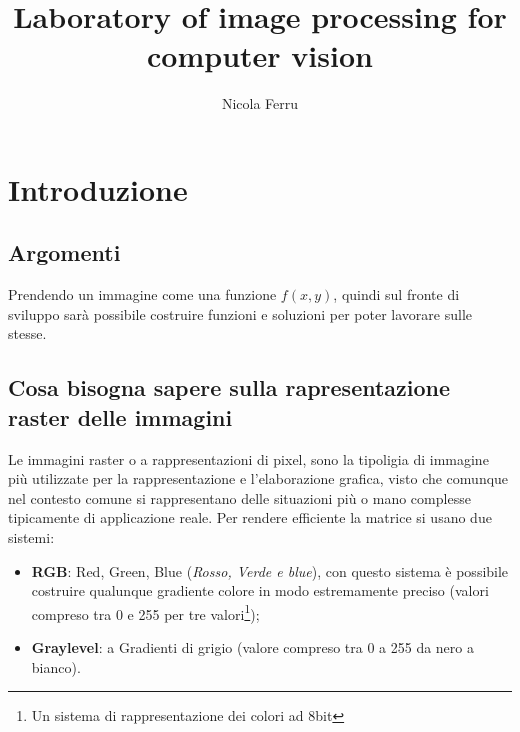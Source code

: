 \documentclass{report}
\title{Laboratory of image processing for computer vision}
\author{Nicola Ferru}
\begin{document}
\maketitle
\tableofcontents

\chapter{Introduzione}
\label{chap:Intro}

\section{Argomenti}
\label{sec:argomento}
Prendendo un immagine come una funzione $f(x,y)$, quindi sul fronte di
sviluppo sarà possibile costruire funzioni e soluzioni per poter
lavorare sulle stesse.

\section{Cosa bisogna sapere sulla rapresentazione raster delle immagini}
\label{sec:raster}

Le immagini raster o a rappresentazioni di pixel, sono la tipoligia di
immagine più utilizzate per la rappresentazione e l'elaborazione grafica,
visto che comunque nel contesto comune si rappresentano delle situazioni
più o mano complesse tipicamente di applicazione reale. Per rendere
efficiente la matrice si usano due sistemi:
\begin{itemize}
\item \textbf{RGB}: Red, Green, Blue (\textit{{\color{red}Rosso}, {\color{green}Verde} e {\color{blue}blue}}), con questo
  sistema è possibile costruire qualunque gradiente colore in modo
  estremamente preciso (valori compreso tra 0 e 255 per tre valori\footnote{Un sistema di rappresentazione dei colori ad 8bit});
\item \textbf{Graylevel}: a Gradienti di grigio (valore compreso tra 0 a
  255 da nero a bianco).
\end{itemize}
\end{document}
